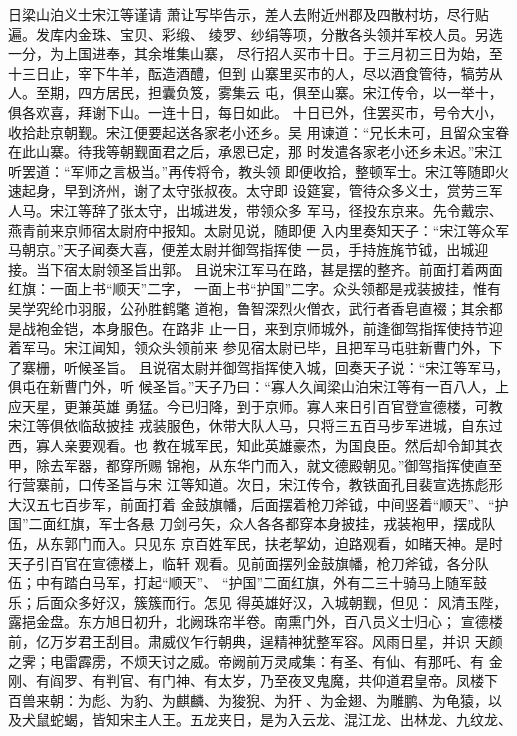日梁山泊义士宋江等谨请
萧让写毕告示，差人去附近州郡及四散村坊，尽行贴遍。发库内金珠、宝贝、彩缎、
绫罗、纱绢等项，分散各头领并军校人员。另选一分，为上国进奉，其余堆集山寨，
尽行招人买市十日。于三月初三日为始，至十三日止，宰下牛羊，酝造酒醴，但到
山寨里买市的人，尽以酒食管待，犒劳从人。至期，四方居民，担囊负笈，雾集云
屯，俱至山寨。宋江传令，以一举十，俱各欢喜，拜谢下山。一连十日，每日如此。
十日已外，住罢买市，号令大小，收拾赴京朝觐。宋江便要起送各家老小还乡。吴
用谏道：“兄长未可，且留众宝眷在此山寨。待我等朝觐面君之后，承恩已定，那
时发遣各家老小还乡未迟。”宋江听罢道：“军师之言极当。”再传将令，教头领
即便收拾，整顿军士。宋江等随即火速起身，早到济州，谢了太守张叔夜。太守即
设筵宴，管待众多义士，赏劳三军人马。宋江等辞了张太守，出城进发，带领众多
军马，径投东京来。先令戴宗、燕青前来京师宿太尉府中报知。太尉见说，随即便
入内里奏知天子：“宋江等众军马朝京。”天子闻奏大喜，便差太尉并御驾指挥使
一员，手持旌旄节钺，出城迎接。当下宿太尉领圣旨出郭。
且说宋江军马在路，甚是摆的整齐。前面打着两面红旗：一面上书“顺天”二字，
一面上书“护国”二字。众头领都是戎装披挂，惟有吴学究纶巾羽服，公孙胜鹤氅
道袍，鲁智深烈火僧衣，武行者香皂直裰；其余都是战袍金铠，本身服色。在路非
止一日，来到京师城外，前逢御驾指挥使持节迎着军马。宋江闻知，领众头领前来
参见宿太尉已毕，且把军马屯驻新曹门外，下了寨栅，听候圣旨。
且说宿太尉并御驾指挥使入城，回奏天子说：“宋江等军马，俱屯在新曹门外，听
候圣旨。”天子乃曰：“寡人久闻梁山泊宋江等有一百八人，上应天星，更兼英雄
勇猛。今已归降，到于京师。寡人来日引百官登宣德楼，可教宋江等俱依临敌披挂
戎装服色，休带大队人马，只将三五百马步军进城，自东过西，寡人亲要观看。也
教在城军民，知此英雄豪杰，为国良臣。然后却令卸其衣甲，除去军器，都穿所赐
锦袍，从东华门而入，就文德殿朝见。”御驾指挥使直至行营寨前，口传圣旨与宋
江等知道。次日，宋江传令，教铁面孔目裴宣选拣彪形大汉五七百步军，前面打着
金鼓旗幡，后面摆着枪刀斧钺，中间竖着“顺天”、“护国”二面红旗，军士各悬
刀剑弓矢，众人各各都穿本身披挂，戎装袍甲，摆成队伍，从东郭门而入。只见东
京百姓军民，扶老挈幼，迫路观看，如睹天神。是时天子引百官在宣德楼上，临轩
观看。见前面摆列金鼓旗幡，枪刀斧钺，各分队伍；中有踏白马军，打起“顺天”、
“护国”二面红旗，外有二三十骑马上随军鼓乐；后面众多好汉，簇簇而行。怎见
得英雄好汉，入城朝觐，但见：
风清玉陛，露挹金盘。东方旭日初升，北阙珠帘半卷。南熏门外，百八员义士归心；
宣德楼前，亿万岁君王刮目。肃威仪乍行朝典，逞精神犹整军容。风雨日星，并识
天颜之霁；电雷霹雳，不烦天讨之威。帝阙前万灵咸集：有圣、有仙、有那吒、有
金刚、有阎罗、有判官、有门神、有太岁，乃至夜叉鬼魔，共仰道君皇帝。凤楼下
百兽来朝：为彪、为豹、为麒麟、为狻猊、为犴、为金翅、为雕鹏、为龟猿，以
及犬鼠蛇蝎，皆知宋主人王。五龙夹日，是为入云龙、混江龙、出林龙、九纹龙、
